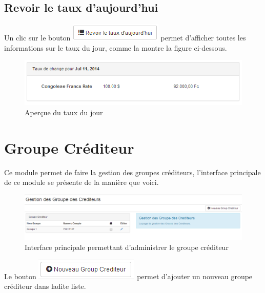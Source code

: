 \documentclass[12pt,a4paper]{report}
\begin{document}
\subsection{Revoir le taux d'aujourd'hui}
Un clic sur le bouton \includegraphics[scale=0.7]{pic/RevoirTaux.png} permet d'afficher toutes les informations sur le taux du jour, comme la montre la figure ci-dessous.
\begin{figure}[h]
\begin{center}
\includegraphics[width=12cm]{pic/ShowRate.png}
\end{center}
\caption{Aperçue du taux du jour}
\label{Aperçue du taux du jour}
\end{figure}
\newpage
\section{Groupe Créditeur}
Ce module permet de faire la gestion des groupes créditeurs, l'interface principale de ce module se présente de la manière que voici.

\begin{figure}[h]
\begin{center}
\includegraphics[width=12cm]{pic/AdminGroupCredit.png}
\end{center}
\caption{Interface principale permettant d'administrer le groupe créditeur}
\label{Interface principale permettant d'administrer le groupe créditeur}
\end{figure}


Le bouton \includegraphics[scale=0.7]{pic/NewGroupCredit.png} permet d'ajouter un nouveau groupe créditeur dans ladite liste.
\end{document}
